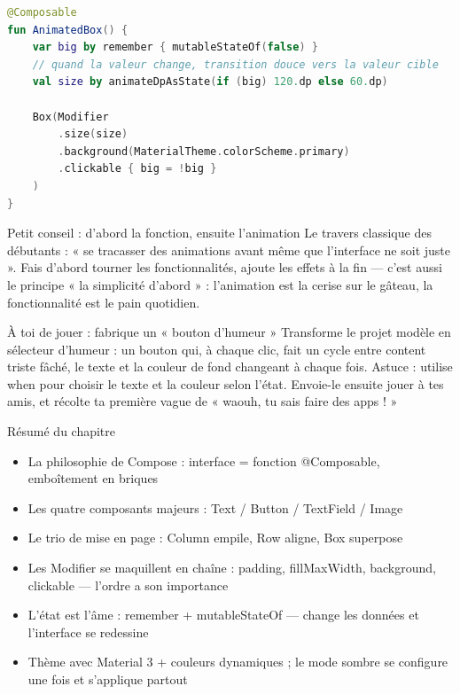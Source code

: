 \begin{lstlisting}[language=Kotlin]
@Composable
fun AnimatedBox() {
    var big by remember { mutableStateOf(false) }
    // quand la valeur change, transition douce vers la valeur cible
    val size by animateDpAsState(if (big) 120.dp else 60.dp)

    Box(Modifier
        .size(size)
        .background(MaterialTheme.colorScheme.primary)
        .clickable { big = !big }
    )
}
\end{lstlisting}

\begin{tcbinfo}{Petit conseil : d'abord la fonction, ensuite l'animation}
Le travers classique des débutants : « se tracasser des animations avant même que l'interface ne soit juste ». Fais d'abord tourner les fonctionnalités, ajoute les effets à la fin — c'est aussi le principe « la simplicité d'abord » : l'animation est la cerise sur le gâteau, la fonctionnalité est le pain quotidien.

\end{tcbinfo}

\begin{tcbpractice}{À toi de jouer : fabrique un « bouton d'humeur »}
Transforme le projet modèle en sélecteur d'humeur : un bouton qui, à chaque clic, fait un cycle entre content triste fâché, le texte et la couleur de fond changeant à chaque fois. Astuce : utilise when pour choisir le texte et la couleur selon l'état. Envoie-le ensuite jouer à tes amis, et récolte ta première vague de « waouh, tu sais faire des apps ! »

\end{tcbpractice}

\begin{tcbsummary}{Résumé du chapitre}
\begin{itemize}
  \item La philosophie de Compose : interface = fonction @Composable, emboîtement en briques
  \item Les quatre composants majeurs : Text / Button / TextField / Image
  \item Le trio de mise en page : Column empile, Row aligne, Box superpose
  \item Les Modifier se maquillent en chaîne : padding, fillMaxWidth, background, clickable — l'ordre a son importance
  \item L'état est l'âme : remember + mutableStateOf — change les données et l'interface se redessine
  \item Thème avec Material 3 + couleurs dynamiques ; le mode sombre se configure une fois et s'applique partout
\end{itemize}

\end{tcbsummary}
